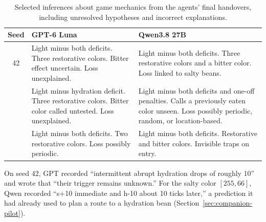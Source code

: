 \begin{table}[!htbp]
    \caption{Selected inferences about game mechanics from the agents' final handovers, including unresolved hypotheses and incorrect explanations.}
    \label{tab:companion-final-handovers}
    \centering
    \begin{tabularx}{\columnwidth}{
        @{}
        c
        >{\raggedright\arraybackslash}X
        >{\raggedright\arraybackslash}X
        @{}
    }
        \toprule
        \textbf{Seed} & \textbf{GPT-6 Luna} & \textbf{Qwen3.8 27B} \\
        \midrule
        42 &
        Light minus both deficits.\newline
        Three restorative colors. Bitter effect uncertain.\newline
        Loss unexplained. &
        Light minus both deficits.\newline
        Three restorative colors and a bitter color.\newline
        Loss linked to salty beans. \\
        \addlinespace
        43 &
        Light minus hydration deficit.\newline
        Three restorative colors. Bitter color called untested.\newline
        Loss unexplained. &
        Light minus both deficits and one-off penalties.\newline
        Calls a previously eaten color unseen.\newline
        Loss possibly periodic, random, or location-based. \\
        \addlinespace
        44 &
        Light minus both deficits.\newline
        Two restorative colors.\newline
        Loss possibly periodic. &
        Light minus both deficits.\newline
        Restorative and bitter colors.\newline
        Invisible traps on entry. \\
        \bottomrule
    \end{tabularx}
\end{table}

On seed 42, GPT recorded ``intermittent abrupt hydration drops of roughly 10'' and wrote that ``their trigger remains unknown.''
For the salty color $[255,66]$, Qwen recorded ``s+10 immediate and h-10 about 10 ticks later,'' a prediction it had already used to plan a route to a hydration bean (Section~\ref{sec:companion-pilot}).
